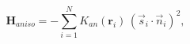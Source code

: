 \documentclass[preview]{standalone}
\begin{document}
\begin{varwidth}{50in}
  \begin{equation}
    \bm{H}_{aniso}  = -\sum_{{ i}=1}^{N} K_{an}(\bm{r}_{i})\, \left( \vec{s}_{i} \cdot \vec{n}_{i} \right)^2, \nonumber
  \end{equation}
\end{varwidth}
\end{document}
